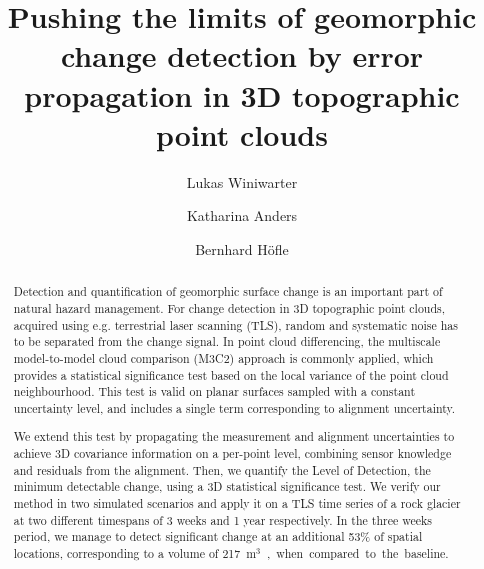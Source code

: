 \documentclass[preprint,12pt,3p]{elsarticle}
\begin{document}
\begin{frontmatter}


\title{Pushing the limits of geomorphic change detection by error propagation in 3D topographic point clouds}




\author[1]{Lukas Winiwarter}
\author[1,2]{Katharina Anders}
\author[1,2]{Bernhard Höfle}
\address[1]{3DGeo Research Group, Institute of Geography, Heidelberg University, Germany}
\address[2]{Institute for Scientific Computing (IWR), Heidelberg University, Germany}

\begin{abstract}
Detection and quantification of geomorphic surface change is an important part of natural hazard management. For change detection in 3D topographic point clouds, acquired using e.g. terrestrial laser scanning (TLS), random and systematic noise has to be separated from the change signal. In point cloud differencing, the multiscale model-to-model cloud comparison (M3C2) approach is commonly applied, which provides a statistical significance test based on the local variance of the point cloud neighbourhood. This test is valid on planar surfaces sampled with a constant uncertainty level, and includes a single term corresponding to alignment uncertainty. 

We extend this test by propagating the measurement and alignment uncertainties to achieve 3D covariance information on a per-point level, combining sensor knowledge and residuals from the alignment. Then, we quantify the Level of Detection, the minimum detectable change, using a 3D statistical significance test. 
We verify our method in two simulated scenarios and apply it on a TLS time series of a rock glacier at two different timespans of 3 weeks and 1 year respectively. 
In the three weeks period, we manage to detect significant change at an additional 53\% of
spatial locations, corresponding to a volume of \SI{217}{m$^3$}, when compared to the baseline. 
\end{abstract}


\end{frontmatter}
\end{document}
